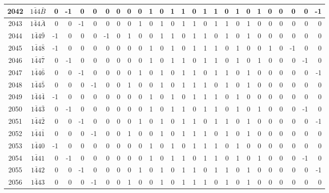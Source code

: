 \documentclass[12 pt]{article}%
\begin{document}
\begin{tiny}
\begin{centering}
\begin{longtable}{|c|c||rrrrrrrrrrrrrrrrrrrrrrrr|}
      \hline
      2042 & $1\bar44\bar B$ & 0 & -1 & 0 & 0 & 0 & 0 & 0 & 0 & 1 & 0 & 1 & 1 & 0 & 1 & 1 & 0 & 1 & 0 & 1 & 0 & 0 & 0 & 0 & -1 \\
      \hline
      2043 & $1\bar44\bar A$ & 0 & 0 & -1 & 0 & 0 & 0 & 0 & 1 & 0 & 1 & 0 & 1 & 1 & 0 & 1 & 1 & 0 & 1 & 0 & 0 & 0 & 0 & 0 & 0 \\
      \hline
      2044 & $1\bar44\bar9$ & -1 & 0 & 0 & 0 & -1 & 0 & 1 & 0 & 0 & 1 & 1 & 0 & 1 & 1 & 0 & 1 & 0 & 1 & 0 & 0 & 0 & 0 & 0 & 0 \\
      \hline
      2045 & $1\bar44\bar8$ & -1 & 0 & 0 & 0 & 0 & 0 & 0 & 0 & 1 & 0 & 1 & 0 & 1 & 1 & 1 & 0 & 1 & 0 & 0 & 1 & 0 & -1 & 0 & 0 \\
      \hline
      2046 & $1\bar44\bar7$ & 0 & -1 & 0 & 0 & 0 & 0 & 0 & 0 & 1 & 0 & 1 & 1 & 0 & 1 & 1 & 0 & 1 & 0 & 1 & 0 & 0 & 0 & -1 & 0 \\
      \hline
      2047 & $1\bar44\bar6$ & 0 & 0 & -1 & 0 & 0 & 0 & 0 & 1 & 0 & 1 & 0 & 1 & 1 & 0 & 1 & 1 & 0 & 1 & 0 & 0 & 0 & 0 & 0 & -1 \\
      \hline
      2048 & $1\bar44\bar5$ & 0 & 0 & 0 & -1 & 0 & 0 & 1 & 0 & 0 & 1 & 0 & 1 & 1 & 1 & 0 & 1 & 0 & 1 & 0 & 0 & 0 & 0 & 0 & 0 \\
      \hline
      2049 & $1\bar44\bar4$ & -1 & 0 & 0 & 0 & 0 & 0 & 0 & 0 & 1 & 0 & 1 & 0 & 1 & 1 & 1 & 0 & 1 & 0 & 0 & 0 & 0 & 0 & 0 & 0 \\
      \hline
      2050 & $1\bar44\bar3$ & 0 & -1 & 0 & 0 & 0 & 0 & 0 & 0 & 1 & 0 & 1 & 1 & 0 & 1 & 1 & 0 & 1 & 0 & 1 & 0 & 0 & 0 & -1 & 0 \\
      \hline
      2051 & $1\bar44\bar2$ & 0 & 0 & -1 & 0 & 0 & 0 & 0 & 1 & 0 & 1 & 0 & 1 & 1 & 0 & 1 & 1 & 0 & 1 & 0 & 0 & 0 & 0 & 0 & -1 \\
      \hline
      2052 & $1\bar44\bar1$ & 0 & 0 & 0 & -1 & 0 & 0 & 1 & 0 & 0 & 1 & 0 & 1 & 1 & 1 & 0 & 1 & 0 & 1 & 0 & 0 & 0 & 0 & 0 & 0 \\
      \hline
      2053 & $1\bar440$ & -1 & 0 & 0 & 0 & 0 & 0 & 0 & 0 & 1 & 0 & 1 & 0 & 1 & 1 & 1 & 0 & 1 & 0 & 0 & 0 & 0 & 0 & 0 & 0 \\
      \hline
      2054 & $1\bar441$ & 0 & -1 & 0 & 0 & 0 & 0 & 0 & 0 & 1 & 0 & 1 & 1 & 0 & 1 & 1 & 0 & 1 & 0 & 1 & 0 & 0 & 0 & -1 & 0 \\
      \hline
      2055 & $1\bar442$ & 0 & 0 & -1 & 0 & 0 & 0 & 0 & 1 & 0 & 1 & 0 & 1 & 1 & 0 & 1 & 1 & 0 & 1 & 0 & 0 & 0 & 0 & 0 & -1 \\
      \hline
      2056 & $1\bar443$ & 0 & 0 & 0 & -1 & 0 & 0 & 1 & 0 & 0 & 1 & 0 & 1 & 1 & 1 & 0 & 1 & 0 & 1 & 0 & 0 & 0 & 0 & 0 & 0 \\

\end{longtable}
\end{centering}
\end{tiny}
\end{document}
